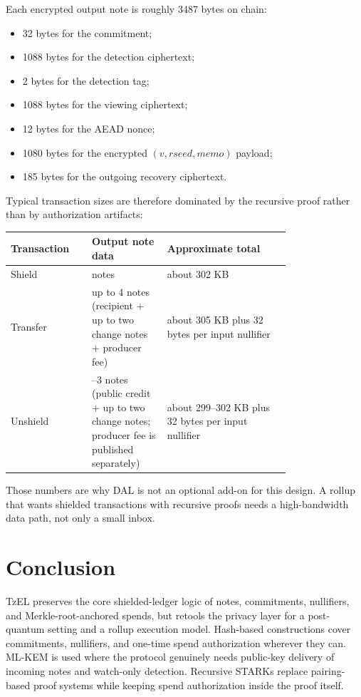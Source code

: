 \documentclass[11pt]{article}
\newcommand{\TzEL}{TzEL}
\begin{document}
Each encrypted output note is roughly 3487 bytes on chain:

\begin{itemize}
  \item 32 bytes for the commitment;
  \item 1088 bytes for the detection ciphertext;
  \item 2 bytes for the detection tag;
  \item 1088 bytes for the viewing ciphertext;
  \item 12 bytes for the AEAD nonce;
  \item 1080 bytes for the encrypted \((v, rseed, memo)\) payload;
  \item 185 bytes for the outgoing recovery ciphertext.
\end{itemize}

Typical transaction sizes are therefore dominated by the recursive proof rather
than by authorization artifacts:

\begin{center}
\begin{tabular}{>{\raggedright\arraybackslash}p{0.20\linewidth} >{\raggedright\arraybackslash}p{0.22\linewidth} >{\raggedright\arraybackslash}p{0.36\linewidth}}
\toprule
Transaction & Output note data & Approximate total \\
\midrule
Shield & 2 notes & about 302 KB \\
Transfer & up to 4 notes (recipient + up to two change notes + producer fee) & about 305 KB plus 32 bytes per input nullifier \\
Unshield & 1--3 notes (public credit + up to two change notes; producer fee is published separately) & about 299--302 KB plus 32 bytes per input nullifier \\
\bottomrule
\end{tabular}
\end{center}

Those numbers are why DAL is not an optional add-on for this design. A rollup
that wants shielded transactions with recursive proofs needs a high-bandwidth
data path, not only a small inbox.

\section{Conclusion}

\TzEL{} preserves the core shielded-ledger logic of notes, commitments,
nullifiers, and Merkle-root-anchored spends, but retools the privacy layer for
a post-quantum setting and a rollup execution model. Hash-based constructions
cover commitments, nullifiers, and one-time spend authorization wherever they
can. ML-KEM is used where the protocol genuinely needs public-key delivery of
incoming notes and watch-only detection. Recursive STARKs replace pairing-based
proof systems while keeping spend authorization inside the proof itself.
\end{document}
